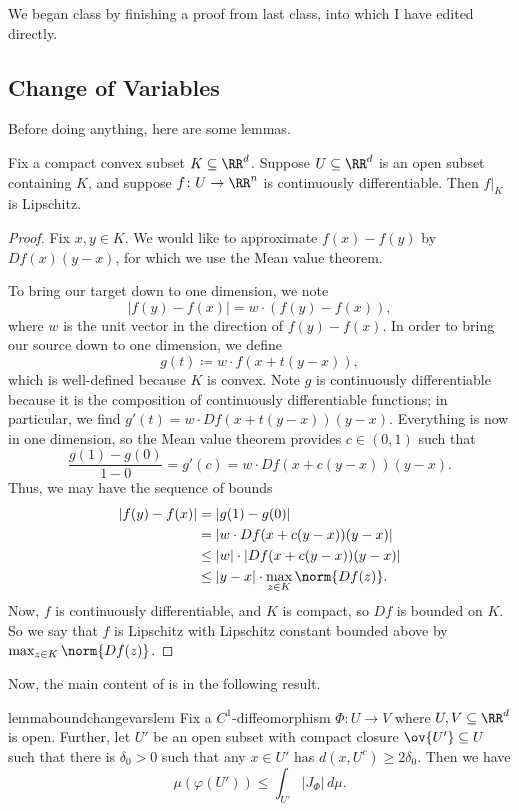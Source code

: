 \documentclass[../notes.tex]{subfiles}
\begin{document}
We began class by finishing a proof from last class, into which I have edited directly.

\subsection{Change of Variables}
Before doing anything, here are some lemmas.
\begin{lemma} \label{lem:compact-convex-to-lip}
	Fix a compact convex subset $K\subseteq\RR^d$. Suppose $U\subseteq\RR^d$ is an open subset containing $K$, and suppose $f\colon U\to\RR^n$ is continuously differentiable. Then $f|_K$ is Lipschitz.
\end{lemma}
\begin{proof}
	Fix $x,y\in K$. We would like to approximate $f(x)-f(y)$ by $Df(x)(y-x)$, for which we use the Mean value theorem.
	
	To bring our target down to one dimension, we note
	\[\left|f(y)-f(x)\right|=w\cdot(f(y)-f(x)),\]
	where $w$ is the unit vector in the direction of $f(y)-f(x)$. In order to bring our source down to one dimension, we define
	\[g(t)\coloneqq w\cdot f(x+t(y-x)),\]
	which is well-defined because $K$ is convex. Note $g$ is continuously differentiable because it is the composition of continuously differentiable functions; in particular, we find $g'(t)=w\cdot Df(x+t(y-x))(y-x)$. Everything is now in one dimension, so the Mean value theorem provides $c\in(0,1)$ such that
	\[\frac{g(1)-g(0)}{1-0}=g'(c)=w\cdot Df(x+c(y-x))(y-x).\]
	Thus, we may have the sequence of bounds
	\begin{align*}
		\left|f(y)-f(x)\right| &= \left|g(1)-g(0)\right| \\
		&= \left|w\cdot Df(x+c(y-x))(y-x)\right| \\
		&\le \left|w\right|\cdot\left|Df(x+c(y-x))(y-x)\right| \\
		&\le \left|y-x\right|\cdot\max_{z\in K}\norm{Df(z)}.
	\end{align*}
	Now, $f$ is continuously differentiable, and $K$ is compact, so $Df$ is bounded on $K$. So we say that $f$ is Lipschitz with Lipschitz constant bounded above by $\max_{z\in K}\norm{Df(z)}$.
\end{proof}
Now, the main content of  is in the following result.
\begin{restatable}{lemma}{boundchangevarslem} \label{lem:bound-change-vars}
	Fix a $C^1$-diffeomorphism $\Phi\colon U\to V$ where $U,V\subseteq\RR^d$ is open. Further, let $U'$ be an open subset with compact closure $\ov{U'}\subseteq U$ such that there is $\delta_0>0$ such that any $x\in U'$ has $d(x,U^c)\ge2\delta_0$. Then we have
	\[\mu(\varphi(U'))\le\int_{U'}\left|J_\Phi\right|\,d\mu.\]
\end{restatable}
\end{document}
